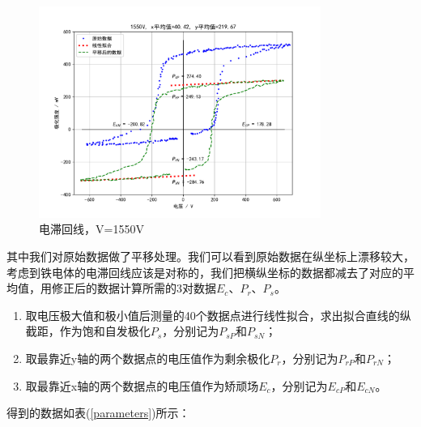 \documentclass[a4paper]{article}
\begin{document}
\begin{figure}[!h]
    \centering
    \includegraphics[width=0.82\textwidth]{fig/1550V.pdf}
    \caption{电滞回线，V=1550V}\label{1550V}
\end{figure}

其中我们对原始数据做了平移处理。我们可以看到原始数据在纵坐标上漂移较大，考虑到铁电体的电滞回线应该是对称的，我们把横纵坐标的数据都减去了对应的平均值，用修正后的数据计算所需的3对数据$E_c$、$P_r$、$P_s$。

\begin{enumerate}
    \item 取电压极大值和极小值后测量的40个数据点进行线性拟合，求出拟合直线的纵截距，作为饱和自发极化$P_s$，分别记为$P_{sP}$和$P_{sN}$；
    \item 取最靠近y轴的两个数据点的电压值作为剩余极化$P_r$，分别记为$P_{rP}$和$P_{rN}$；
    \item 取最靠近x轴的两个数据点的电压值作为矫顽场$E_c$，分别记为$E_{cP}$和$E_{cN}$。
\end{enumerate}

得到的数据如表(\ref{parameters})所示：
\end{document}
